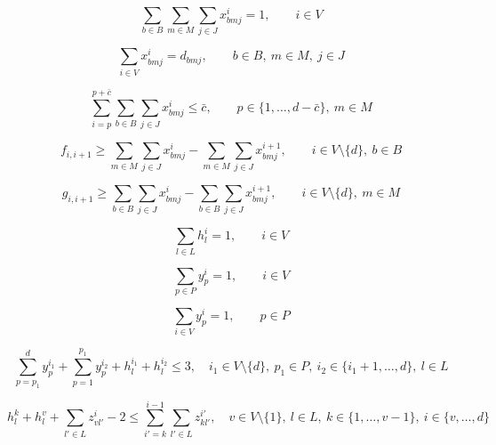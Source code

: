 \documentclass[10pt,a4paper]{article}
\begin{document}
\begin{equation}
\sum_{b \in B} \sum_{m \in M} \sum_{j \in J} x_{bmj}^i = 1,
\qquad i \in V
\tag{2}
\end{equation}

\begin{equation}
\sum_{i \in V} x_{bmj}^i = d_{bmj},
\qquad b \in B,\ m \in M,\ j \in J
\tag{3}
\end{equation}

\begin{equation}
\sum_{i=p}^{p+\bar{c}} \sum_{b \in B} \sum_{j \in J} x_{bmj}^i \le \bar{c},
\qquad p \in \{1,\ldots,d-\bar{c}\},\ m \in M
\tag{4}
\end{equation}

\begin{equation}
f_{i,i+1}
\ge
\sum_{m \in M} \sum_{j \in J} x_{bmj}^i
- \sum_{m \in M} \sum_{j \in J} x_{bmj}^{i+1},
\qquad i \in V \setminus \{d\},\ b \in B
\tag{5}
\end{equation}

\begin{equation}
g_{i,i+1}
\ge
\sum_{b \in B} \sum_{j \in J} x_{bmj}^i
- \sum_{b \in B} \sum_{j \in J} x_{bmj}^{i+1},
\qquad i \in V \setminus \{d\},\ m \in M
\tag{6}
\end{equation}

\begin{equation}
\sum_{l \in L} h_l^i = 1,
\qquad i \in V
\tag{7}
\end{equation}

\begin{equation}
\sum_{p \in P} y_p^i = 1,
\qquad i \in V
\tag{8}
\end{equation}

\begin{equation}
\sum_{i \in V} y_p^i = 1,
\qquad p \in P
\tag{9}
\end{equation}

\begin{equation}
\sum_{p=p_1}^{d} y_p^{i_1}
+ \sum_{p=1}^{p_1} y_p^{i_2}
+ h_l^{i_1}
+ h_l^{i_2}
\le 3,
\quad
i_1 \in V \setminus \{d\},\ p_1 \in P,\ i_2 \in \{i_1+1,\ldots,d\},\ l \in L
\tag{10}
\end{equation}

\begin{equation}
h_l^k + h_l^v + \sum_{l' \in L} z_{vl'}^i - 2
\le
\sum_{i'=k}^{i-1} \sum_{l' \in L} z_{kl'}^{i'},
\quad
v \in V \setminus \{1\},\ l \in L,\ k \in \{1,\ldots,v-1\},\ i \in \{v,\ldots,d\}
\tag{11}
\end{equation}
\end{document}
